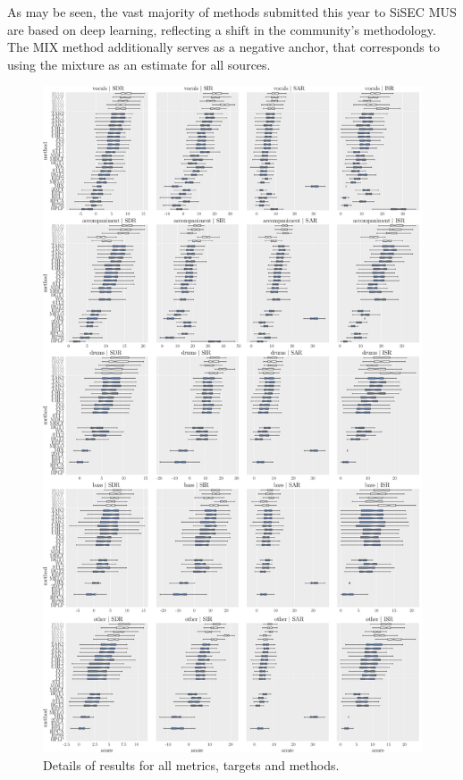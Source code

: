 \documentclass{llncs}
\begin{document}
As may be seen, the vast majority of methods submitted this year to SiSEC MUS are based on deep learning, reflecting a shift in the community's methodology. The MIX method additionally serves as a negative anchor, that corresponds to using the mixture as an estimate for all sources.
\begin{figure}
  \begin{center}
     \includegraphics[height=\textheight]{fig/boxplot.pdf}
     \vspace{-0.5cm}
  \end{center}
  \caption{Details of results for all metrics, targets and methods.}
  \label{fig:boxplots_bsseval}
\end{figure}
\end{document}
